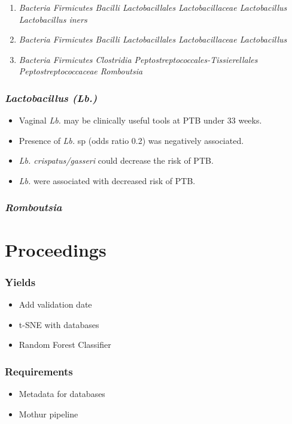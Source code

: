\documentclass{beamer}
\begin{document}
\begin{frame}[allowframebreaks]
        \begin{enumerate}[a]
            \item \textit{Bacteria Firmicutes Bacilli Lactobacillales Lactobacillaceae Lactobacillus Lactobacillus iners}
            \item \textit{Bacteria Firmicutes Bacilli Lactobacillales Lactobacillaceae Lactobacillus}
            \item \textit{Bacteria Firmicutes Clostridia Peptostreptococcales-Tissierellales Peptostreptococcaceae Romboutsia}
        \end{enumerate}
    \end{frame}

    \begin{frame}
        \frametitle{\textit{Lactobacillus (Lb.)}}

        \begin{itemize}
            \item Vaginal \textit{Lb.} may be clinically useful tools at PTB under 33 weeks. \cite{lb1}
            \item Presence of \textit{Lb.} sp (odds ratio 0.2) was negatively associated. \cite{lb2}
            \item \textit{Lb. crispatus/gasseri} could decrease the risk of PTB. \cite{lb3}
            \item \textit{Lb.} were associated with decreased risk of PTB. \cite{lb4}
        \end{itemize}
    \end{frame}

    \begin{frame}
        \frametitle{\textit{Romboutsia}}
    \end{frame}

    \section{Proceedings}
    \begin{frame}
        \frametitle{Yields}

        \begin{itemize}
            \item Add validation date
            \item t-SNE with databases
            \item Random Forest Classifier
        \end{itemize}
    \end{frame}

    \begin{frame}
        \frametitle{Requirements}

        \begin{itemize}
            \item Metadata for databases
            \item Mothur pipeline
        \end{itemize}
    \end{frame}
\end{document}
